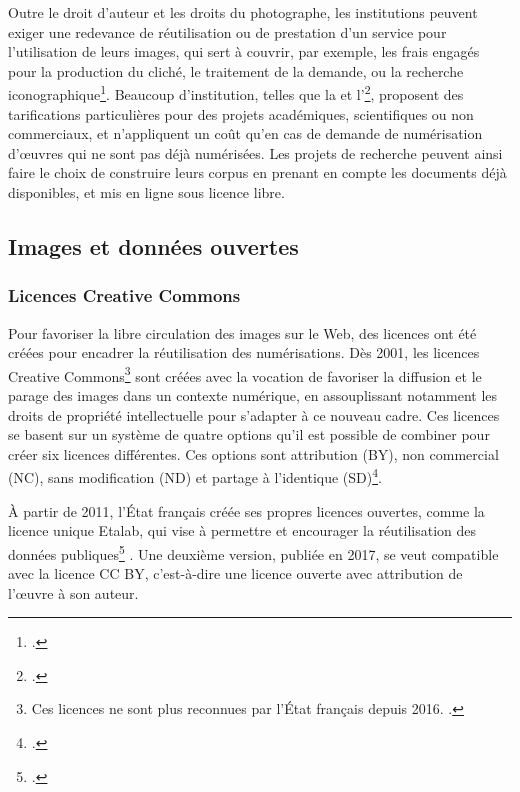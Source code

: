 Outre le droit d'auteur et les droits du photographe, les institutions peuvent exiger une redevance de réutilisation ou de prestation d'un service pour l'utilisation de leurs images, qui sert à couvrir, par exemple, les frais engagés pour la production du cliché, le traitement de la demande, ou la recherche iconographique\footcite{institutnationaldhistoiredelartGuidePratiquePour}. Beaucoup d'institution, telles que la \bnf et l'\inha\footcite{denoyelleProposCoutImages2021}, proposent des tarifications particulières pour des projets académiques, scientifiques ou non commerciaux, et n'appliquent un coût qu'en cas de demande de numérisation d'œuvres qui ne sont pas déjà numérisées. Les projets de recherche peuvent ainsi faire le choix de construire leurs corpus en prenant en compte les documents déjà disponibles, et mis en ligne sous licence libre.

    \subsection{Images et données ouvertes}
        \subsubsection{Licences Creative Commons}
Pour favoriser la libre circulation des images sur le Web, des licences ont été créées pour encadrer la réutilisation des numérisations. Dès 2001, les licences Creative Commons\footnote{Ces licences ne sont plus reconnues par l'État français depuis 2016. \cite{denoyelleSavoirLicenceEtalab2021}.} sont créées avec la vocation de favoriser la diffusion et le parage des images dans un contexte numérique, en assouplissant notamment les droits de propriété intellectuelle pour s'adapter à ce nouveau cadre. Ces licences se basent sur un système de quatre options qu'il est possible de combiner pour créer six licences différentes. Ces options sont attribution (BY), non commercial (NC), sans modification (ND) et partage à l’identique (SD)\footcite{institutnationaldhistoiredelartGuidePratiquePour}. 

À partir de 2011, l'État français créée ses propres licences ouvertes, comme la licence unique Etalab, qui vise à \og permettre et encourager la réutilisation des données publiques\footcite{denoyelleSavoirLicenceEtalab2021} \fg. Une deuxième version, publiée en 2017, se veut compatible avec la licence CC BY, c'est-à-dire une licence ouverte avec attribution de l'œuvre à son auteur.

